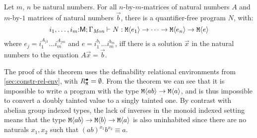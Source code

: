 







\begin{theorem}
  \label{thm:monoid-indefinability}
  Let $m$, $n$ be natural numbers. For all $n$-by-$m$-matrices of
  natural numbers $A$ and $m$-by-$1$ matrices of natural numbers $\vec{b}$,
  there is a quantifier-free program $N$, with:
  \begin{displaymath}
    i_1,\dots,i_m\mathord:\mathsf{M}; \Gamma_{\textit{Mon}} \vdash N : \textup{\texttt{M}}\langle e_1 \rangle \to \dots \to \textup{\texttt{M}}\langle e_n \rangle \to \textup{\texttt{M}}\langle e \rangle
  \end{displaymath}
  where $e_j = i_1^{A_{j1}}\dots i_m^{A_{jm}}$ and $e = i_1^{b_1}\dots
  i_m^{b_m}$, iff there is a solution $\vec{x}$ in the
  natural numbers to the equation $A \vec{x} = \vec{b}$.
\end{theorem}

The proof of this theorem uses the definability relational
environments from \autoref{sec:constr-rel-env}, with
$R^\bullet_{\textup{\texttt{M}}} = \emptyset$. From the theorem we can see
that it is impossible to write a program with the type
$\textup{\texttt{M}}\langle ab \rangle \to \textup{\texttt{M}}\langle a \rangle$, and is thus impossible to
convert a doubly tainted value to a singly tainted one.
%
By contrast with abelian group indexed types, the lack of inverses in
the monoid indexed setting means that the type $\textup{\texttt{M}}\langle ab \rangle \to
\textup{\texttt{M}}\langle b \rangle \to \textup{\texttt{M}}\langle a \rangle$ is also uninhabited since there are
no naturals $x_1,x_2$ such that $(ab)^{x_1}b^{x_2} \equiv a$.


